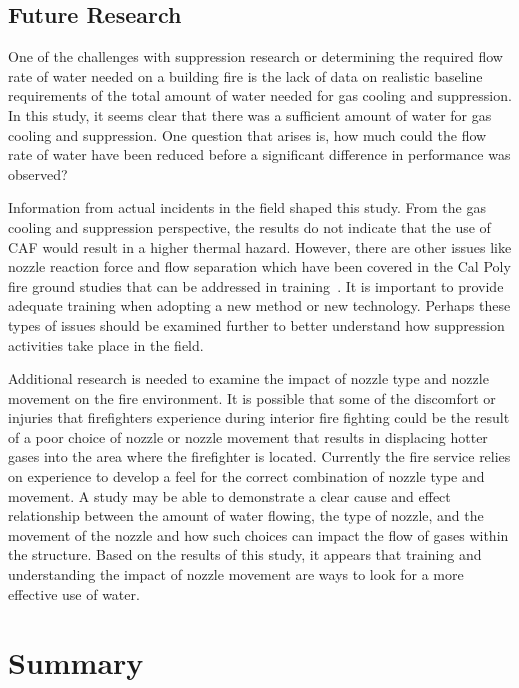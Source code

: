 \documentclass[12pt,oneside]{book}
\begin{document}
\section{Future Research}

One of the challenges with suppression research or determining the required flow rate of water needed on a building fire is the lack of data on realistic baseline requirements of the total amount of water needed for gas cooling and suppression. In this study, it seems clear that there was a sufficient amount of water for gas cooling and suppression. One question that arises is, how much could the flow rate of water have been reduced before a significant difference in performance was observed? 

Information from actual incidents in the field shaped this study. From the gas cooling and suppression perspective, the results do not indicate that the use of CAF would result in a higher thermal hazard. However, there are other issues like nozzle reaction force and flow separation which have been covered in the Cal Poly fire ground studies that can be addressed in training~\cite{Carracino:2013,Dicus:2013,LaPolla:2012}.  It is important to provide adequate training when adopting a new method or new technology. Perhaps these types of issues should be examined further to better understand how suppression activities take place in the field.

Additional research is needed to examine the impact of nozzle type and nozzle movement on the fire environment. It is possible that some of the discomfort or injuries that firefighters experience during interior fire fighting could be the result of a poor choice of nozzle or nozzle movement that results in displacing hotter gases into the area where the firefighter is located. Currently the fire service relies on experience to develop a feel for the correct combination of nozzle type and movement. A study may be able to demonstrate a clear cause and effect relationship between the amount of water flowing, the type of nozzle, and the movement of the nozzle and how such choices can impact the flow of gases within the structure. Based on the results of this study, it appears that training and understanding the impact of nozzle movement are ways to look for a more effective use of water. 

\chapter{Summary}
\label{chap:Summary}
\end{document}
